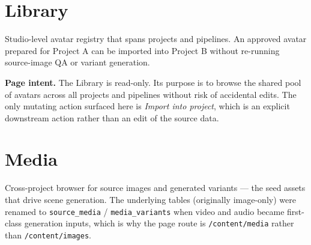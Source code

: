 \section{Library}
\label{sec:content-library}

Studio-level avatar registry that spans projects and pipelines. An approved avatar
prepared for Project A can be imported into Project B without re-running source-image
QA or variant generation.


\begin{itemize}
\end{itemize}


\begin{designnote}
\textbf{Page intent.} The Library is read-only. Its purpose is to browse
the shared pool of avatars across all projects and pipelines without risk
of accidental edits. The only mutating action surfaced here is
\emph{Import into project}, which is an explicit downstream action rather
than an edit of the source data.
\end{designnote}

\section{Media}
\label{sec:content-media}

Cross-project browser for source images and generated variants — the seed assets
that drive scene generation. The underlying tables (originally image-only) were
renamed to \texttt{source\_media} / \texttt{media\_variants} when video and audio
became first-class generation inputs, which is why the page route is
\texttt{/content/media} rather than \texttt{/content/images}.


